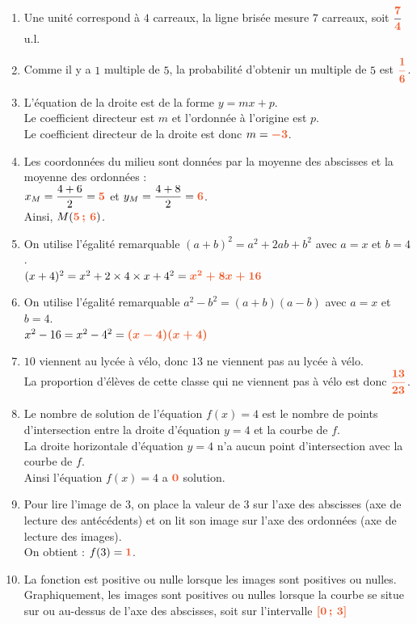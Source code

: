 \documentclass[a4paper,11pt]{article}
\begin{document}
\begin{seanceD}{}
\begin{enumerate}
	\item Une unité correspond à $4$ carreaux, la ligne brisée mesure $7$ carreaux, soit $\dfrac{{\color[HTML]{f15929}\boldsymbol{7}}}{{\color[HTML]{f15929}\boldsymbol{4}}}$ u.l. 
	\item Comme il y a $1$ multiple de $5$, la probabilité d'obtenir un multiple de $5$ est ${\color[HTML]{f15929}\boldsymbol{\dfrac{1}{6}}}$.
	\item L'équation de la droite est de la forme $y=mx+p$.\\
       Le coefficient directeur est $m$ et l'ordonnée à l'origine est $p$. \\
      Le coefficient directeur de la droite est donc $m={\color[HTML]{f15929}\boldsymbol{-3}}$.
	\item Les coordonnées du milieu sont données par la moyenne des abscisses et la moyenne des ordonnées : \\
      $x_M=\dfrac{4+6}{2}={\color[HTML]{f15929}\boldsymbol{5}}$ et $y_M=\dfrac{4+8}{2}={\color[HTML]{f15929}\boldsymbol{6}}$.\\
      Ainsi,  $M({\color[HTML]{f15929}\boldsymbol{5\,;\,6}})$.
	\item On utilise l'égalité remarquable $(a+b)^2=a^2+2ab+b^2$ avec $a=x$ et $b=4$.\\
      $(x+4)^2=x^2+2 \times 4 \times x+4^2={\color[HTML]{f15929}\boldsymbol{x^2+8x+16}}$
	\item On utilise l'égalité remarquable $a^2-b^2=(a+b)(a-b)$ avec $a=x$ et $b=4$.\\
      $x^2-16=x^2-4^2={\color[HTML]{f15929}\boldsymbol{(x-4)(x+4)}}$
	\item $10$ viennent au lycée à vélo, donc $13$ ne viennent pas au lycée à vélo.\\
      La proportion d’élèves de cette classe qui ne viennent pas à vélo est donc ${\color[HTML]{f15929}\boldsymbol{\dfrac{13}{23}}}$.
	\item Le nombre de solution de l'équation $f(x)=4$ est le nombre de points d'intersection entre la droite d'équation $y=4$ et la courbe de $f$. \\La droite horizontale d'équation $y=4$ n'a aucun point d'intersection avec la courbe de $f$. \\
          Ainsi l'équation $f(x)=4$ a ${\color[HTML]{f15929}\boldsymbol{0}}$ solution.
	\item Pour lire l'image de $3$, on place la valeur de $3$ sur l'axe des abscisses (axe de lecture  des antécédents) et on lit
           son image  sur l'axe des ordonnées (axe de lecture des images). \\
           On obtient :  $f(3)={\color[HTML]{f15929}\boldsymbol{1}}$.
	\item La fonction est positive ou nulle lorsque les images sont positives ou nulles.\\
        Graphiquement, les images sont positives ou nulles  lorsque la courbe se situe sur ou au-dessus  de l'axe des abscisses, soit sur l'intervalle  
        ${\color[HTML]{f15929}\boldsymbol{[0\,;\,3]}}$
        
\end{enumerate}


\end{seanceD}
\end{document}
